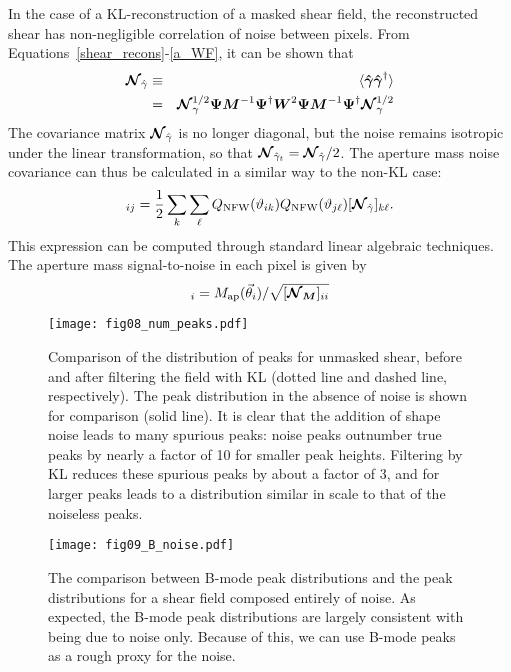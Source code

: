 In the case of a KL-reconstruction of a masked shear field, the reconstructed
shear has non-negligible correlation of noise between pixels.  
From Equations~\ref{shear_recons}-\ref{a_WF}, it can be shown that
\begin{eqnarray}
  \boldsymbol{\mathcal{N}}_{\hat\gamma} 
  & \equiv  &
  \langle\boldsymbol{\hat\gamma} \boldsymbol{\hat\gamma}^\dagger\rangle\nonumber\\
  & = & \boldsymbol{\mathcal{N}}_\gamma^{1/2}\boldsymbol{\Psi} \boldsymbol{M}^{-1} \boldsymbol{\Psi}^\dagger \boldsymbol{W}^2 \boldsymbol{\Psi} \boldsymbol{M}^{-1} \boldsymbol{\Psi}^\dagger \boldsymbol{\mathcal{N}}_\gamma^{1/2}
\end{eqnarray}
The covariance matrix $\boldsymbol{\mathcal{N}}_{\hat\gamma}$ is no longer diagonal, but
the noise remains isotropic under the linear transformation, so that
$\boldsymbol{\mathcal{N}}_{\hat{\gamma}_t} = \boldsymbol{\mathcal{N}}_{\hat{\gamma}}/2$.
The aperture mass noise covariance can thus be calculated in a similar 
way to the non-KL case:
\begin{equation}
  [\Noise_M]_{ij} = \frac{1}{2}\sum_k\sum_\ell Q_{\rm NFW}(\vartheta_{ik})
  Q_{\rm NFW}(\vartheta_{j\ell}) [\Noise_{\hat\gamma}]_{k\ell}.
\end{equation}
This expression can be computed through standard linear algebraic techniques.  
The aperture mass signal-to-noise in each pixel is given by 
\begin{equation}
  [S/N]_i = M_{\rm ap}(\vec\theta_i)/\sqrt{[\mymat{\Noise_M}]_{ii}}
\end{equation}

\begin{figure}
 \centering
 \texttt{[image: fig08\_num\_peaks.pdf]}
 \caption{
   Comparison of the distribution of \Map peaks for unmasked shear,
   before and after filtering
   the field with KL (dotted line and dashed line, respectively).  The
   peak distribution in the absence of noise is shown for comparison
   (solid line).  It is clear that the addition of shape noise leads to 
   many spurious \Map peaks: noise peaks outnumber true peaks by nearly a
   factor of 10 for smaller peak heights.  Filtering by KL reduces these
   spurious peaks by about a factor of 3, and for larger peaks leads
   to a distribution similar in scale to that of the noiseless peaks.
   \label{fig_num_peaks}  
 } 
\end{figure}

\begin{figure}
 \centering
 \texttt{[image: fig09\_B\_noise.pdf]}
 \caption{The comparison between B-mode peak distributions and the
   peak distributions for a shear field composed entirely of noise.
   As expected, the B-mode peak distributions are largely consistent
   with being due to noise only.  Because of this, we can use B-mode
   peaks as a rough proxy for the noise.
   \label{fig_B_noise} 
 }
\end{figure}

